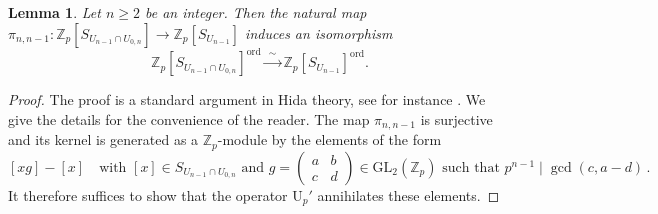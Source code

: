 \documentclass{amsart}
\numberwithin{equation}{section}
\newtheorem{lemma}[theorem]{Lemma}
\newcommand{\bb}{\mathbb}
\newcommand{\ord}{\mathrm{ord}}
\newcommand{\GL}{\mathrm{GL}}
\begin{document}
\begin{lemma}\label{lemma:Hida}
    Let $n\geq 2$ be an integer. Then the natural map $\pi_{n,n-1}:\mathbb{Z}_p[S_{U_{n-1}\cap U_{0,n}}]\rightarrow \mathbb{Z}_p[S_{U_{n-1}}]$ induces an isomorphism
    \[
    \mathbb{Z}_p[S_{U_{n-1}\cap U_{0,n}}]^{\ord}\xrightarrow{\,\,\sim\,\,} \mathbb{Z}_p[S_{U_{n-1}}]^\ord.
    \]
\end{lemma}
\begin{proof}
    The proof is a standard argument in Hida theory, see for instance \cite{EmertonHida}. We give the details for the convenience of the reader.
    The map $\pi_{n,n-1}$ is surjective and its kernel is generated as a $\mathbb{Z}_p$-module by the elements of the form
    \[
    [xg]-[x]\quad \text{with } [x]\in S_{U_{n-1}\cap U_{0,n}} \text{ and } g=\begin{pmatrix} a & b \\ c & d \end{pmatrix}\in \GL_2(\bb{Z}_p) \text{ such that } p^{n-1}\mid \gcd(c, a-d)\,.
    \]
    It therefore suffices to show that the operator $\mathrm{U}_p'$ annihilates these elements.


\end{proof}
\end{document}
